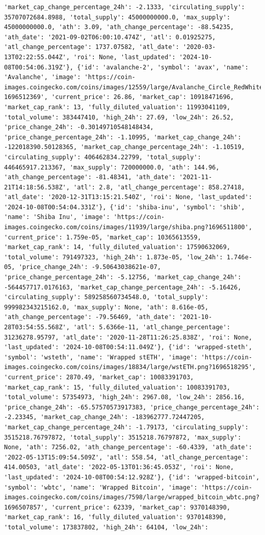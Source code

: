\documentclass[
  letterpaper,
  DIV=11,
  numbers=noendperiod]{scrreprt}
\begin{document}
\begin{verbatim}
'market_cap_change_percentage_24h': -2.1333, 'circulating_supply': 35707072684.8988, 'total_supply': 45000000000.0, 'max_supply': 45000000000.0, 'ath': 3.09, 'ath_change_percentage': -88.54235, 'ath_date': '2021-09-02T06:00:10.474Z', 'atl': 0.01925275, 'atl_change_percentage': 1737.07582, 'atl_date': '2020-03-13T02:22:55.044Z', 'roi': None, 'last_updated': '2024-10-08T00:54:06.319Z'}, {'id': 'avalanche-2', 'symbol': 'avax', 'name': 'Avalanche', 'image': 'https://coin-images.coingecko.com/coins/images/12559/large/Avalanche_Circle_RedWhite_Trans.png?1696512369', 'current_price': 26.86, 'market_cap': 10918471696, 'market_cap_rank': 13, 'fully_diluted_valuation': 11993041109, 'total_volume': 383447410, 'high_24h': 27.69, 'low_24h': 26.52, 'price_change_24h': -0.30149710548148434, 'price_change_percentage_24h': -1.10995, 'market_cap_change_24h': -122018390.50128365, 'market_cap_change_percentage_24h': -1.10519, 'circulating_supply': 406462834.22799, 'total_supply': 446465917.213367, 'max_supply': 720000000.0, 'ath': 144.96, 'ath_change_percentage': -81.48341, 'ath_date': '2021-11-21T14:18:56.538Z', 'atl': 2.8, 'atl_change_percentage': 858.27418, 'atl_date': '2020-12-31T13:15:21.540Z', 'roi': None, 'last_updated': '2024-10-08T00:54:04.331Z'}, {'id': 'shiba-inu', 'symbol': 'shib', 'name': 'Shiba Inu', 'image': 'https://coin-images.coingecko.com/coins/images/11939/large/shiba.png?1696511800', 'current_price': 1.759e-05, 'market_cap': 10365613559, 'market_cap_rank': 14, 'fully_diluted_valuation': 17590632069, 'total_volume': 791497323, 'high_24h': 1.873e-05, 'low_24h': 1.746e-05, 'price_change_24h': -9.50643038621e-07, 'price_change_percentage_24h': -5.12756, 'market_cap_change_24h': -564457717.0176163, 'market_cap_change_percentage_24h': -5.16426, 'circulating_supply': 589258560734548.0, 'total_supply': 999982343215162.0, 'max_supply': None, 'ath': 8.616e-05, 'ath_change_percentage': -79.56469, 'ath_date': '2021-10-28T03:54:55.568Z', 'atl': 5.6366e-11, 'atl_change_percentage': 31236278.95797, 'atl_date': '2020-11-28T11:26:25.838Z', 'roi': None, 'last_updated': '2024-10-08T00:54:11.049Z'}, {'id': 'wrapped-steth', 'symbol': 'wsteth', 'name': 'Wrapped stETH', 'image': 'https://coin-images.coingecko.com/coins/images/18834/large/wstETH.png?1696518295', 'current_price': 2870.49, 'market_cap': 10083391703, 'market_cap_rank': 15, 'fully_diluted_valuation': 10083391703, 'total_volume': 57354973, 'high_24h': 2967.08, 'low_24h': 2856.16, 'price_change_24h': -65.57570573917383, 'price_change_percentage_24h': -2.23345, 'market_cap_change_24h': -183962777.72447205, 'market_cap_change_percentage_24h': -1.79173, 'circulating_supply': 3515218.76797872, 'total_supply': 3515218.76797872, 'max_supply': None, 'ath': 7256.02, 'ath_change_percentage': -60.4339, 'ath_date': '2022-05-13T15:09:54.509Z', 'atl': 558.54, 'atl_change_percentage': 414.00503, 'atl_date': '2022-05-13T01:36:45.053Z', 'roi': None, 'last_updated': '2024-10-08T00:54:12.928Z'}, {'id': 'wrapped-bitcoin', 'symbol': 'wbtc', 'name': 'Wrapped Bitcoin', 'image': 'https://coin-images.coingecko.com/coins/images/7598/large/wrapped_bitcoin_wbtc.png?1696507857', 'current_price': 62339, 'market_cap': 9370148390, 'market_cap_rank': 16, 'fully_diluted_valuation': 9370148390, 'total_volume': 173837802, 'high_24h': 64104, 'low_24h': 
\end{verbatim}
\end{document}
